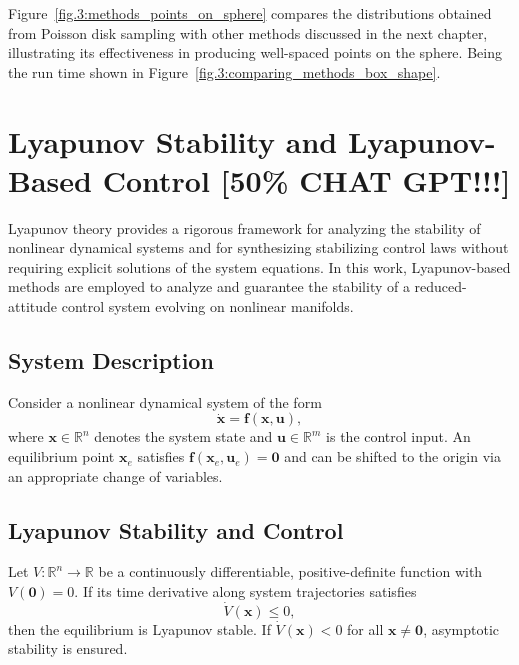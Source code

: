 Figure~\ref{fig.3:methods_points_on_sphere} compares the distributions obtained from Poisson disk sampling with other methods discussed in the next chapter, illustrating its effectiveness in producing well-spaced points on the sphere. Being the run time shown in Figure~\ref{fig.3:comparing_methods_box_shape}.


\section{Lyapunov Stability and Lyapunov-Based Control \textbf{[50\% CHAT GPT!!!]}} \label{sec.3:Lyapunov Stability and Lyapunov-Based Control}

Lyapunov theory provides a rigorous framework for analyzing the stability of nonlinear dynamical systems and for synthesizing stabilizing control laws without requiring explicit solutions of the system equations. In this work, Lyapunov-based methods are employed to analyze and guarantee the stability of a reduced-attitude control system evolving on nonlinear manifolds.

\subsection{System Description}

Consider a nonlinear dynamical system of the form
\begin{equation}
    \dot{\mathbf{x}} = \mathbf{f}(\mathbf{x}, \mathbf{u}),
\end{equation}
where $\mathbf{x} \in \mathbb{R}^n$ denotes the system state and $\mathbf{u} \in \mathbb{R}^m$ is the control input.  
An equilibrium point $\mathbf{x}_e$ satisfies $\mathbf{f}(\mathbf{x}_e, \mathbf{u}_e) = \mathbf{0}$ and can be shifted to the origin via an appropriate change of variables.

\subsection{Lyapunov Stability and Control}

Let $V : \mathbb{R}^n \rightarrow \mathbb{R}$ be a continuously differentiable, positive-definite function with $V(\mathbf{0}) = 0$.  
If its time derivative along system trajectories satisfies
\begin{equation}
    \dot{V}(\mathbf{x}) \le 0,
\end{equation}
then the equilibrium is Lyapunov stable. If $\dot{V}(\mathbf{x}) < 0$ for all $\mathbf{x} \neq \mathbf{0}$, asymptotic stability is ensured.

